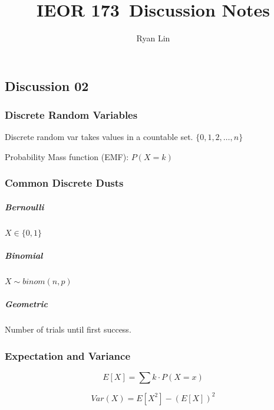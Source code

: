 \documentclass{report}
\title{\Huge{IEOR 173}\ Discussion Notes}
\author{\huge{Ryan Lin}}
\date{}
\begin{document}
\maketitle
\newpage%
\tableofcontents
\pagebreak

\chapter{}
\section{Discussion 02}
\subsection{Discrete Random Variables}

Discrete random var takes values in a countable set. $\{0,1,2,\dots, n\}$

Probability Mass function (EMF): $P(X=k)$

\subsection{Common Discrete Dusts}

\paragraph{Bernoulli} $X \in \{0,1\}$

\paragraph{Binomial} $X \sim binom(n,p)$

\paragraph{Geometric} Number of trials until first success. 


\subsection{Expectation and Variance}
\begin{equation}E[X] = \sum k \cdot P(X=x)  \end{equation}

\begin{equation}
	Var(X) = E[X^2] - (E[X])^2
\end{equation}
\end{document}

